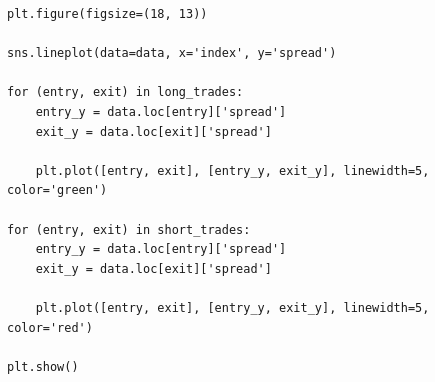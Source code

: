 \documentclass{article}
\begin{document}
\begin{spacing}{2.0}
\begin{lstlisting}
plt.figure(figsize=(18, 13))

sns.lineplot(data=data, x='index', y='spread')

for (entry, exit) in long_trades:
    entry_y = data.loc[entry]['spread']
    exit_y = data.loc[exit]['spread']

    plt.plot([entry, exit], [entry_y, exit_y], linewidth=5, color='green')

for (entry, exit) in short_trades:
    entry_y = data.loc[entry]['spread']
    exit_y = data.loc[exit]['spread']

    plt.plot([entry, exit], [entry_y, exit_y], linewidth=5, color='red')

plt.show()
\end{lstlisting}

\end{spacing}
\end{document}
